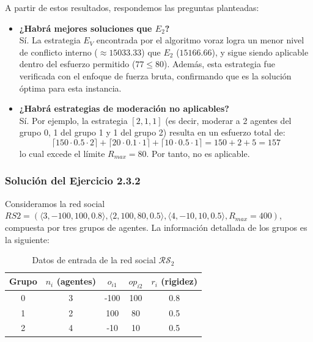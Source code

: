 \documentclass[11pt,letter]{article}
\begin{document}
A partir de estos resultados, respondemos las preguntas planteadas:

\begin{itemize}
    \item \textbf{¿Habrá mejores soluciones que $E_2$?} \\
    Sí. La estrategia $E_V$ encontrada por el algoritmo voraz logra un menor nivel de conflicto interno ($\approx 15033.33$) que $E_2$ ($15166.66$), y sigue siendo aplicable dentro del esfuerzo permitido ($77 \leq 80$). Además, esta estrategia fue verificada con el enfoque de fuerza bruta, confirmando que es la solución óptima para esta instancia.

    \item \textbf{¿Habrá estrategias de moderación no aplicables?} \\
    Sí. Por ejemplo, la estrategia $[2, 1, 1]$ (es decir, moderar a 2 agentes del grupo 0, 1 del grupo 1 y 1 del grupo 2) resulta en un esfuerzo total de:
    \[
    \lceil 150 \cdot 0.5 \cdot 2 \rceil + \lceil 20 \cdot 0.1 \cdot 1 \rceil + \lceil 10 \cdot 0.5 \cdot 1 \rceil = 150 + 2 + 5 = 157
    \]
    lo cual excede el límite $R_{max} = 80$. Por tanto, no es aplicable.

\end{itemize}



\subsubsection{Solución del Ejercicio 2.3.2}

Consideramos la red social $RS2 = ( \langle 3, -100, 100, 0.8 \rangle, \langle 2, 100, 80, 0.5 \rangle, \langle 4, -10, 10, 0.5 \rangle, R_{max} = 400 )$, compuesta por tres grupos de agentes. La información detallada de los grupos es la siguiente:

\begin{table}[H]
\centering
\begin{tabular}{c|c|c|c|c}
\textbf{Grupo} & $n_i$ (agentes) & $o_{i1}$ & $op_{i2}$ & $r_i$ (rigidez) \\
\hline
0 & 3 & -100 & 100 & 0.8 \\
1 & 2 & 100 & 80 & 0.5 \\
2 & 4 & -10 & 10 & 0.5 \\
\end{tabular}
\caption{Datos de entrada de la red social $\mathcal{RS}_2$}
\end{table}
\end{document}

